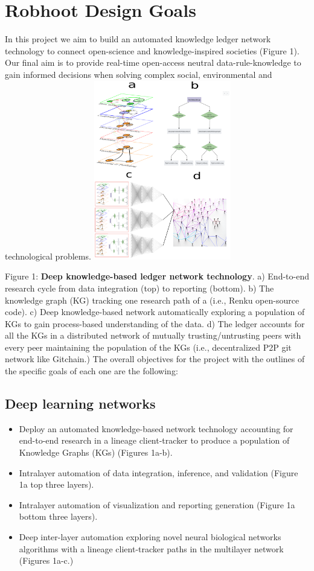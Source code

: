 \documentclass[10pt, a4paper, twocolumn]{article} %
\begin{document}
  \section{Robhoot Design Goals}
  In this project we aim to build an automated knowledge ledger
  network technology to connect open-science and knowledge-inspired
  societies (Figure 1). Our final aim is to provide real-time
  open-access neutral data-rule-knowledge to gain informed decisions
  when solving complex social, environmental and technological
  problems.
  \includegraphics[width=0.45\textwidth]{Figure1.pdf}
  
  {\small Figure 1: {\bf Deep knowledge-based ledger network
      technology}. a) End-to-end research cycle from data integration
    (top) to reporting (bottom). b) The knowledge graph (KG) tracking
    one research path of a (i.e., Renku open-source code). c) Deep
    knowledge-based network automatically exploring a population of
    KGs to gain process-based understanding of the data. d) The ledger
    accounts for all the KGs in a distributed network of mutually
    trusting/untrusting peers with every peer maintaining the
    population of the KGs (i.e., decentralized P2P git network like
    Gitchain.)}
  The overall objectives for the project with the outlines of the
  specific goals of each one are the following:
  \subsection{Deep learning networks}
  \begin{itemize}
  \item Deploy an automated knowledge-based network technology
    accounting for end-to-end research in a lineage client-tracker to
    produce a population of Knowledge Graphs (KGs) (Figures 1a-b).
  \item Intralayer automation of data integration, inference, and
    validation (Figure 1a top three layers).
  \item Intralayer automation of visualization and reporting
    generation (Figure 1a bottom three layers).
  \item Deep inter-layer automation exploring novel neural biological
    networks algorithms with a lineage client-tracker paths in the
    multilayer network (Figures 1a-c.)
  \end{itemize}
\end{document}
